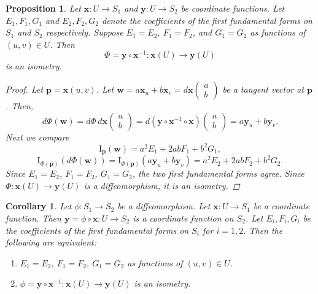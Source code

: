 \documentclass[10pt, a4paper]{article}
\theoremstyle{plain}
\newtheorem{proposition}[theorem]{Proposition}
\newtheorem{corollary}[theorem]{Corollary}
\theoremstyle{definition}
\theoremstyle{remark}
\begin{document}
\begin{proposition}
  Let $\mathbf{x}: U \to S_1$ and $\mathbf{y}: U \to S_2$ be coordinate functions. Let
  $E_1, F_1, G_1$ and $E_2, F_2, G_2$ denote the coefficients of the first fundamental forms
  on $S_1$ and $S_2$ respectively. Suppose $E_1 = E_2$, $F_1 = F_2$, and $G_1 = G_2$ as
  functions of $(u, v) \in U$. Then
  \[
    \Phi = \mathbf{y} \circ \mathbf{x}^{-1} : \mathbf{x}(U) \to \mathbf{y}(U)
  \]
  is an isometry.

  \begin{proof}
  Let $\mathbf{p} = \mathbf{x}(u,v)$. Let $\mathbf{w} = a\mathbf{x}_u + b\mathbf{x}_v =
  d\mathbf{x}\begin{pmatrix}a\\b\end{pmatrix}$ be a tangent vector at $\mathbf{p}$. Then,
  \[
    d\Phi(\mathbf{w})
    = d\Phi\, d\mathbf{x}\begin{pmatrix}a\\b\end{pmatrix}
    = d(\mathbf{y} \circ \mathbf{x}^{-1} \circ \mathbf{x})\begin{pmatrix}a\\b\end{pmatrix}
    = a\mathbf{y}_u + b\mathbf{y}_v.
  \]
  Next we compare
  \[
    \mathrm{I}_{\mathbf{p}}(\mathbf{w}) = a^2 E_1 + 2ab F_1 + b^2 G_1,
  \]
  \[
    \mathrm{I}_{\Phi(\mathbf{p})}(d\Phi(\mathbf{w}))
    = \mathrm{I}_{\Phi(\mathbf{p})}(a\mathbf{y}_u + b\mathbf{y}_v)
    = a^2 E_2 + 2ab F_2 + b^2 G_2.
  \]
  Since $E_1 = E_2$, $F_1 = F_2$, $G_1 = G_2$, the two first fundamental forms agree.
  Since $\Phi: \mathbf{x}(U) \to \mathbf{y}(U)$ is a diffeomorphism, it is an isometry.
\end{proof}
\end{proposition}



\begin{corollary}
  Let $\phi: S_1 \to S_2$ be a diffeomorphism. Let $\mathbf{x}: U \to S_1$ be a coordinate
  function. Then $\mathbf{y} = \phi \circ \mathbf{x}: U \to S_2$ is a coordinate function on
  $S_2$. Let $E_i, F_i, G_i$ be the coefficients of the first fundamental forms on $S_i$ for
  $i = 1, 2$. Then the following are equivalent:
  \begin{enumerate}
    \item $E_1 = E_2,\ F_1 = F_2,\ G_1 = G_2$ as functions of $(u,v) \in U$.
    \item $\phi = \mathbf{y} \circ \mathbf{x}^{-1}: \mathbf{x}(U) \to \mathbf{y}(U)$ is an isometry.
  \end{enumerate}
\end{corollary}
\end{document}

